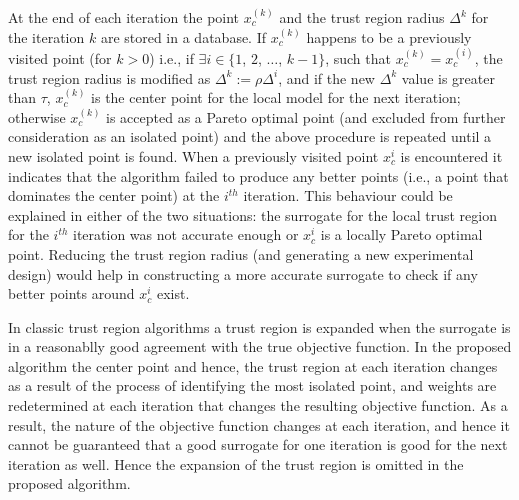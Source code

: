 At the end of each iteration the point $x_c^{(k)}$ and the trust region radius 
$\Delta^k$ for the iteration $k$ are stored in a database. If $x_c^{(k)}$ 
happens to be a previously visited point (for $k > 0$) i.e., if $\exists 
i\in\{1$, $2$, $\ldots$, $k-1\}$, such that $x_c^{(k)} = x_c^{(i)}$, the trust 
region radius is modified as $\Delta^k := \rho\Delta^i$, and if the new 
$\Delta^k$ value is greater than $\tau$, $x_c^{(k)}$ is the center point for 
the local model for the next iteration; otherwise $x_c^{(k)}$ is accepted as a 
Pareto optimal point (and excluded from further consideration as an isolated 
point) and the above procedure is repeated until a new isolated point is 
found. When a previously visited point $x_c^i$ is encountered it indicates 
that the algorithm failed to produce any better points (i.e., a point that
dominates the center point) at the $i^{th}$ iteration. This behaviour could 
be explained in either of the two situations: the surrogate for the local 
trust region for the ${i^{th}}$ iteration was not accurate enough or $x_c^i$ is 
a locally Pareto optimal point. Reducing the trust region radius (and generating 
a new experimental design) would help in constructing a more accurate surrogate 
to check if any better points around $x_c^i$ exist. \smallskip

In classic trust region algorithms a trust region is expanded when the surrogate 
is in a reasonablly good agreement with the true objective function. In the 
proposed algorithm the center point and hence, the trust region at each 
iteration changes as a result of the process of identifying the most isolated 
point, and weights are redetermined at each iteration that changes the resulting 
objective function. As a result, the nature of the objective function changes 
at each iteration, and hence it cannot be guaranteed that a good surrogate for 
one iteration is good for the next iteration as well. Hence the expansion 
of the trust region is omitted in the proposed algorithm. \smallskip

\smallskip

